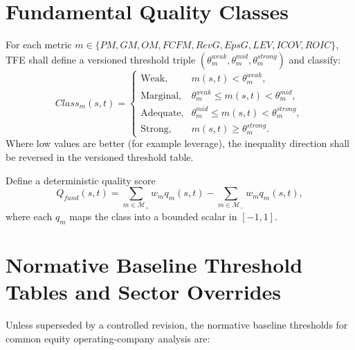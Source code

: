 \section{Fundamental Quality Classes}

For each metric $m\in\{PM,GM,OM,FCFM,RevG,EpsG,LEV,ICOV,ROIC\}$, TFE shall define a versioned threshold triple $(\theta_m^{weak},\theta_m^{mid},\theta_m^{strong})$ and classify:
\[
Class_m(s,t)=
\begin{cases}
\text{Weak}, & m(s,t) < \theta_m^{weak},\\
\text{Marginal}, & \theta_m^{weak}\le m(s,t)<\theta_m^{mid},\\
\text{Adequate}, & \theta_m^{mid}\le m(s,t)<\theta_m^{strong},\\
\text{Strong}, & m(s,t)\ge \theta_m^{strong}.
\end{cases}
\]
Where low values are better (for example leverage), the inequality direction shall be reversed in the versioned threshold table.

Define a deterministic quality score
\[
Q_{fund}(s,t)=\sum_{m\in\mathcal{M}_{+}} w_m q_m(s,t)-\sum_{m\in\mathcal{M}_{-}} w_m q_m(s,t),
\]
where each $q_m$ maps the class into a bounded scalar in $[-1,1]$.


\section{Normative Baseline Threshold Tables and Sector Overrides}

Unless superseded by a controlled revision, the normative baseline thresholds for common equity operating-company analysis are:

